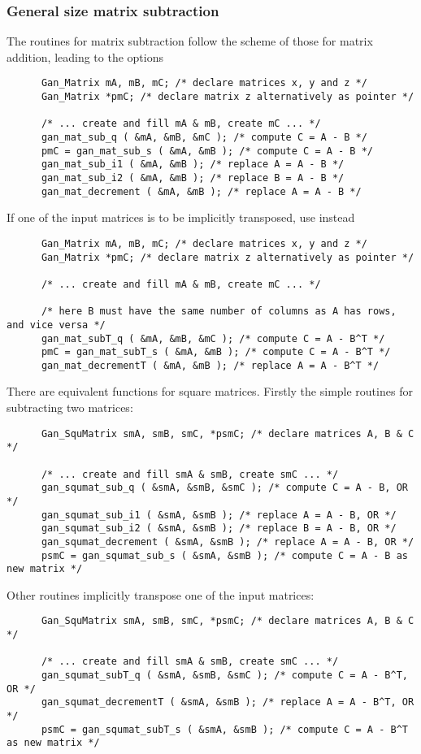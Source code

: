 \subsubsection{General size matrix subtraction}
The routines for matrix subtraction follow the scheme of those for
matrix addition, leading to the options
\begin{verbatim}
      Gan_Matrix mA, mB, mC; /* declare matrices x, y and z */
      Gan_Matrix *pmC; /* declare matrix z alternatively as pointer */

      /* ... create and fill mA & mB, create mC ... */
      gan_mat_sub_q ( &mA, &mB, &mC ); /* compute C = A - B */
      pmC = gan_mat_sub_s ( &mA, &mB ); /* compute C = A - B */
      gan_mat_sub_i1 ( &mA, &mB ); /* replace A = A - B */
      gan_mat_sub_i2 ( &mA, &mB ); /* replace B = A - B */
      gan_mat_decrement ( &mA, &mB ); /* replace A = A - B */
\end{verbatim}
If one of the input matrices is to be implicitly transposed, use instead
\begin{verbatim}
      Gan_Matrix mA, mB, mC; /* declare matrices x, y and z */
      Gan_Matrix *pmC; /* declare matrix z alternatively as pointer */

      /* ... create and fill mA & mB, create mC ... */

      /* here B must have the same number of columns as A has rows, and vice versa */
      gan_mat_subT_q ( &mA, &mB, &mC ); /* compute C = A - B^T */
      pmC = gan_mat_subT_s ( &mA, &mB ); /* compute C = A - B^T */
      gan_mat_decrementT ( &mA, &mB ); /* replace A = A - B^T */
\end{verbatim}

There are equivalent functions for square matrices. Firstly the simple
routines for subtracting two matrices:
\begin{verbatim}
      Gan_SquMatrix smA, smB, smC, *psmC; /* declare matrices A, B & C */

      /* ... create and fill smA & smB, create smC ... */
      gan_squmat_sub_q ( &smA, &smB, &smC ); /* compute C = A - B, OR */
      gan_squmat_sub_i1 ( &smA, &smB ); /* replace A = A - B, OR */
      gan_squmat_sub_i2 ( &smA, &smB ); /* replace B = A - B, OR */
      gan_squmat_decrement ( &smA, &smB ); /* replace A = A - B, OR */
      psmC = gan_squmat_sub_s ( &smA, &smB ); /* compute C = A - B as new matrix */
\end{verbatim}
Other routines implicitly transpose one of the input matrices:
\begin{verbatim}
      Gan_SquMatrix smA, smB, smC, *psmC; /* declare matrices A, B & C */

      /* ... create and fill smA & smB, create smC ... */
      gan_squmat_subT_q ( &smA, &smB, &smC ); /* compute C = A - B^T, OR */
      gan_squmat_decrementT ( &smA, &smB ); /* replace A = A - B^T, OR */
      psmC = gan_squmat_subT_s ( &smA, &smB ); /* compute C = A - B^T as new matrix */
\end{verbatim}

